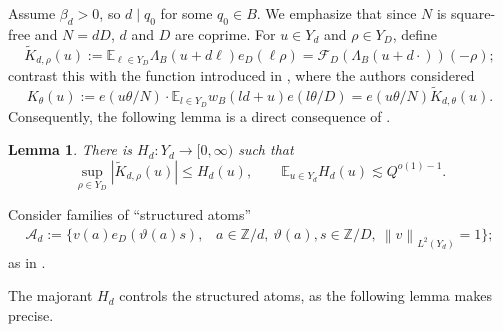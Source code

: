 \documentclass[12pt,leqno]{amsart}
\numberwithin{equation}{section}
\newtheorem{lemma}[equation]{Lemma}
\theoremstyle{definition}
\theoremstyle{plain}
\begin{document}
	\medskip
	
	Assume \(\beta_d>0\), so \(d\mid q_0\) for some \(q_0\in B\). We emphasize that since \(N\) is square-free and \(N=dD\), $d$ and $D$ are coprime. For \(u\in Y_d\) and \(\rho\in Y_D\), define
	\begin{equation}\label{eq:Kdrho-new}
		\widetilde K_{d,\rho}(u)
		:=\mathbb{E}_{\ell\in Y_D}\Lambda_B(u+d\ell)e_D(\ell\rho)= \mathcal{F}_D\left(\Lambda_B(u+d \cdot)\right)(-\rho);
	\end{equation}
	contrast this with the function introduced in \cite[\S 6]{FKMS26}, where the authors considered
	\[ K_\theta(u) := e(u \theta/N) \cdot \mathbb{E}_{l \in Y_D} w_B(ld + u)e(l\theta/D) 
	= e(u \theta/N) \tilde{K}_{d,\theta}(u).\] 
	Consequently, the following lemma is a direct consequence of \cite[Lemma 6.3]{FKMS26}.
	\begin{lemma}\label{lem:fibre-envelope-new}
		There is \(H_d:Y_d\to[0,\infty)\) such that
		\begin{equation}\label{eq:fibre-envelope-new}
			\sup_{\rho\in Y_D}|\widetilde K_{d,\rho}(u)|\le H_d(u),
			\qquad
			\mathbb{E}_{u\in Y_d}H_d(u)\lesssim Q^{o(1)-1}.
		\end{equation}
	\end{lemma}
	
	Consider families of ``structured atoms'' 
	\begin{align}
		\mathcal{A}_d := \{  v(a) e_D(\vartheta(a) s), \; \; \; a \in \mathbb{Z}/d, \ \vartheta(a), s \in \mathbb{Z}/D, \ \left \| v \right \|_{L^2(Y_d)}= 1 \};
	\end{align}
	as in \cite[\S 5]{FKMS26}.
	
	
	The majorant $H_d$ controls the structured atoms, as the following lemma makes precise.
	
\end{document}
